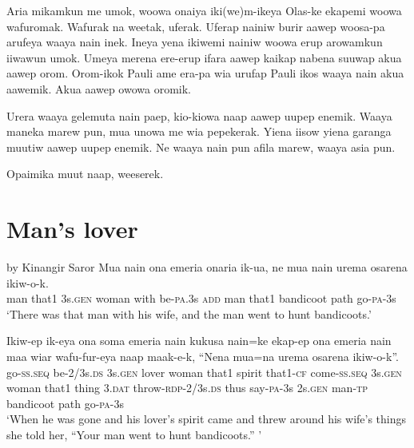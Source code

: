 Aria  mikamkun  me  umok,  woowa  onaiya  iki(we)m-ikeya       Olas-ke  ekapemi  woowa  wafuromak. 
Wafurak  na  weetak,  uferak. 
Uferap  nainiw  burir  aawep  woosa-pa  arufeya waaya  nain  inek. 
Ineya  yena  ikiwemi  nainiw  woowa  erup  arowamkun           iiwawun  umok. 
Umeya  merena  ere-erup  ifara  aawep  kaikap  nabena            suuwap  akua  aawep  orom. 
Orom-ikok  Pauli  ame  era-pa  wia  urufap  Pauli  ikos             waaya  nain  akua  aawemik. 
Akua  aawep  owowa  oromik.

Urera  waaya  gelemuta  nain  paep,  kio-kiowa  naap  aawep   uupep  enemik. 
Waaya  maneka  marew  pun,  mua  unowa  me  wia  pepekerak. 
Yiena  iisow  yiena  garanga  muutiw  aawep  uupep         enemik. 
Ne  waaya  nain  pun  afila  marew,  waaya  asia  pun. 

Opaimika  muut  naap,  weeserek. 


\section{Man’s lover}\label{app:2:lover}
by Kinangir Saror
\ea
\gll  Mua  nain  ona  emeria  onaria  ik-ua,  ne  mua  nain  urema  osarena  ikiw-o-k. \\
man  that1  3s.\textsc{gen}  woman  with  be-\textsc{pa}.3s  \textsc{add}  man  that1  bandicoot  path  go-\textsc{pa}-3s \\


\glt ‘There was that man with his wife, and the man went to hunt bandicoots.’ \\
\z


\ea
\gll  Ikiw-ep  ik-eya  ona  soma  emeria  nain  kukusa  nain=ke        ekap-ep  ona  emeria  nain  maa  wiar  wafu-fur-eya                 naap  maak-e-k,  “Nena  mua=na  urema  osarena  ikiw-o-k”. \\
go-\textsc{ss.seq}  be-2/3s.\textsc{ds}  3s.\textsc{gen}  lover  woman  that1  spirit  that1-\textsc{cf}   come-\textsc{ss.seq}  3s.\textsc{gen}  woman  that1  thing  3.\textsc{dat}  throw-\textsc{rdp}-2/3s.\textsc{ds}  thus  say-\textsc{pa}-3s  2s.\textsc{gen}  man-\textsc{tp}  bandicoot  path  go-\textsc{pa}-3s \\




\glt ‘When he was gone and his lover’s spirit came and threw around his wife’s things she told her, “Your man went to hunt bandicoots.” ’ \\
\z


